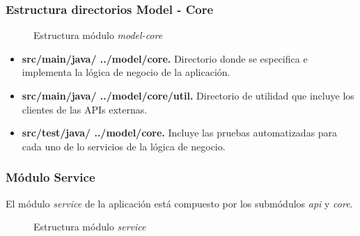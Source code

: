 \subsubsection*{Estructura directorios Model - Core}
\begin{figure}[H]
\centering
{}
\caption{Estructura módulo \textit{model-core}}
\end{figure}

\begin{itemize}
	\item \textbf{src/main/java/ ../model/core. }Directorio donde se especifica e implementa la lógica de negocio de la aplicación.
	\item \textbf{src/main/java/ ../model/core/util. }Directorio de utilidad que incluye los clientes de las APIs externas.
	\item \textbf{src/test/java/ ../model/core. }Incluye las pruebas automatizadas para cada uno de lo servicios de la lógica de negocio.
\end{itemize}


\newpage
\subsubsection*{Módulo Service}
El módulo \textit{service} de la aplicación está compuesto por los submódulos \textit{api} y \textit{core}.

\begin{figure}[H]
\centering
{}
\caption{Estructura módulo \textit{service}}
\end{figure}


